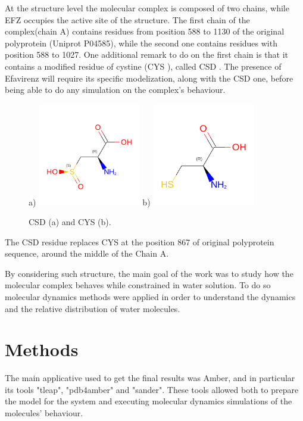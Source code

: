 \documentclass[12pt]{article}
\begin{document}
At the structure level the molecular complex is composed of two chains, while EFZ occupies the active site of the structure.
The first chain of the complex(chain A) contains residues from position 588 to 1130 of the original polyprotein (Uniprot P04585), while the second one contains residues with position 588 to 1027. One additional remark to do on the first chain is that it contains a modified residue of cystine (CYS \cite{CYS}), called CSD \cite{CSD}. The presence of Efavirenz \cite{EFZ} will require its specific modelization, along with the CSD one, before being able to do any simulation on the complex's behaviour.
\begin{figure}[H]
    \centering
    a)
    \includegraphics[width=0.4\textwidth]{../figures/CSD.png}
    b)
    \includegraphics[width=0.4\textwidth]{../figures/CYS.png}
    \caption{CSD (a) and CYS (b).\label{fig:CSDCYS}}
\end{figure}

The CSD residue replaces CYS at the position 867 of original polyprotein sequence, around the middle of the Chain A.

By considering such structure, the main goal of the work was to study how the molecular complex behaves while constrained in water solution. To do so molecular dynamics methods were applied in order to understand the dynamics and the relative distribution of water molecules.

\section{Methods}
The main applicative used to get the final results was Amber\cite{Amber}, and in particular its tools "tleap", "pdb4amber" and "sander". These tools allowed both to prepare the model for the system and executing molecular dynamics simulations of the molecules' behaviour.
\end{document}
